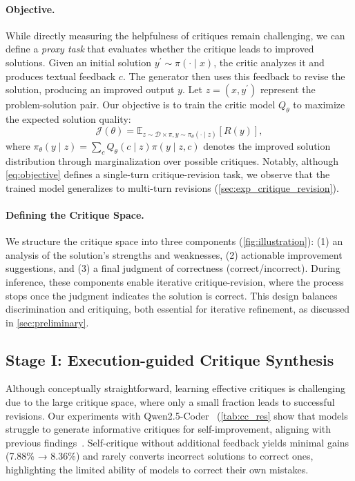 \paragraph{Objective.}
While directly measuring the helpfulness of critiques remain challenging, we can define a \emph{proxy task} that evaluates whether the critique leads to improved solutions.
Given an initial solution $y^\prime \sim \pi(\cdot \mid x)$, the critic analyzes it and produces textual feedback $c$. The generator then uses this feedback to revise the solution, producing an improved output $y$.
Let $z = (x, y^\prime)$ represent the problem-solution pair.
Our objective is to train the critic model $Q_\theta$ to maximize the expected solution quality:
\begin{equation}\label{eq:objective}
    \mathcal{J}(\theta) = \mathbb{E}_{z\sim \mathcal{D} \times \pi, y \sim \pi_\theta(\cdot \mid z)}[R(y)],
\end{equation}
where $\pi_{\theta}(y \mid z) = \sum_{c} {Q_\theta}(c \mid z) \pi(y \mid z, c)$ denotes the improved solution distribution through marginalization over possible critiques.
Notably, although \cref{eq:objective} defines a single-turn critique-revision task, we observe that the trained model generalizes to multi-turn revisions (\cref{sec:exp_critique_revision}).

\paragraph{Defining the Critique Space.} We structure the critique space into three components (\cref{fig:illustration}): (1) an analysis of the solution's strengths and weaknesses, (2) actionable improvement suggestions, and (3) a final judgment of correctness (correct/incorrect). During inference, these components enable iterative critique-revision, where the process stops once the judgment indicates the solution is correct. This design balances discrimination and critiquing, both essential for iterative refinement, as discussed in \cref{sec:preliminary}.




\subsection{Stage I: Execution-guided Critique Synthesis}\label{sec:sft}
Although conceptually straightforward, learning effective critiques is challenging due to the large critique space, where only a small fraction leads to successful revisions. Our experiments with Qwen2.5-Coder~\cite{hui2024qwen2} (\cref{tab:cc_res} show that models struggle to generate informative critiques for self-improvement, aligning with previous findings~\cite{huang2023large}. Self-critique without additional feedback yields minimal gains (7.88\% → 8.36\%) and rarely converts incorrect solutions to correct ones, highlighting the limited ability of models to correct their own mistakes.

